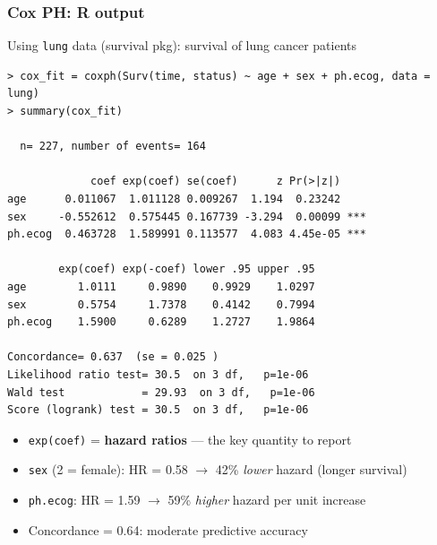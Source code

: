 \begin{frame}[fragile]
\frametitle{Cox PH: R output}
\centering

\vspace{2pt}
{\scriptsize Using \texttt{lung} data (survival pkg): survival of lung cancer patients}

\vspace{4pt}

{\fontsize{4.5pt}{5.5pt}\selectfont
\begin{verbatim}
> cox_fit = coxph(Surv(time, status) ~ age + sex + ph.ecog, data = lung)
> summary(cox_fit)

  n= 227, number of events= 164

             coef exp(coef) se(coef)      z Pr(>|z|)
age      0.011067  1.011128 0.009267  1.194  0.23242
sex     -0.552612  0.575445 0.167739 -3.294  0.00099 ***
ph.ecog  0.463728  1.589991 0.113577  4.083 4.45e-05 ***

        exp(coef) exp(-coef) lower .95 upper .95
age        1.0111     0.9890    0.9929    1.0297
sex        0.5754     1.7378    0.4142    0.7994
ph.ecog    1.5900     0.6289    1.2727    1.9864

Concordance= 0.637  (se = 0.025 )
Likelihood ratio test= 30.5  on 3 df,   p=1e-06
Wald test            = 29.93  on 3 df,   p=1e-06
Score (logrank) test = 30.5  on 3 df,   p=1e-06
\end{verbatim}
}

\vspace{4pt}

\begin{itemize}
\item {\small \texttt{exp(coef)} = \textbf{hazard ratios} --- the key quantity to report}
\item {\small \texttt{sex} (2 = female): HR = 0.58 $\to$ 42\% \textit{lower} hazard (longer survival)}
\item {\small \texttt{ph.ecog}: HR = 1.59 $\to$ 59\% \textit{higher} hazard per unit increase}
\item {\small Concordance = 0.64: moderate predictive accuracy}
\end{itemize}

\end{frame}
